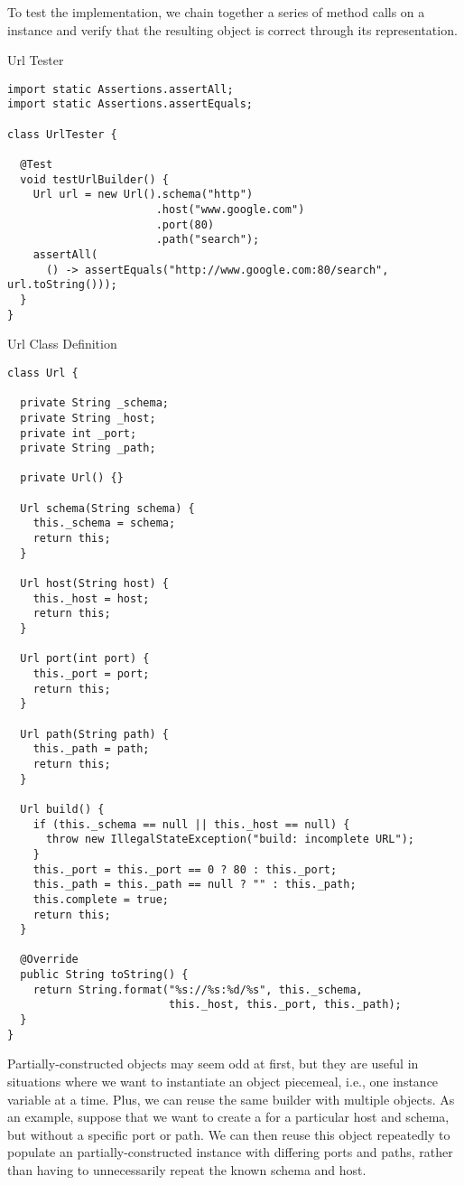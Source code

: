 To test the implementation, we chain together a series of method calls on a  instance and verify that the resulting  object is correct through its  representation.

\begin{cl}{Url Tester}
\begin{lstlisting}[language=MyJava]
import static Assertions.assertAll;
import static Assertions.assertEquals;

class UrlTester {

  @Test
  void testUrlBuilder() {
    Url url = new Url().schema("http")
                       .host("www.google.com")
                       .port(80)
                       .path("search");
    assertAll(
      () -> assertEquals("http://www.google.com:80/search", url.toString()));
  }
}
\end{lstlisting}
\end{cl}

\begin{cl}{Url Class Definition}
\begin{lstlisting}[language=MyJava]
class Url {

  private String _schema;
  private String _host;
  private int _port;
  private String _path;
  
  private Url() {}

  Url schema(String schema) {
    this._schema = schema;
    return this;
  }

  Url host(String host) {
    this._host = host;
    return this;
  }

  Url port(int port) {
    this._port = port;
    return this;
  }

  Url path(String path) {
    this._path = path;
    return this;
  }

  Url build() {
    if (this._schema == null || this._host == null) {
      throw new IllegalStateException("build: incomplete URL");
    }
    this._port = this._port == 0 ? 80 : this._port;
    this._path = this._path == null ? "" : this._path;
    this.complete = true;
    return this;
  }

  @Override
  public String toString() {
    return String.format("%s://%s:%d/%s", this._schema,
                         this._host, this._port, this._path);
  }
}
\end{lstlisting}
\end{cl}

Partially-constructed objects may seem odd at first, but they are useful in situations where we want to instantiate an object piecemeal, i.e., one instance variable at a time. Plus, we can reuse the same builder with multiple objects. As an example, suppose that we want to create a  for a particular host and schema, but without a specific port or path. We can then reuse this object repeatedly to populate an partially-constructed instance with differing ports and paths, rather than having to unnecessarily repeat the known schema and host.

